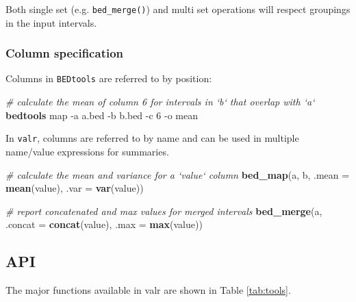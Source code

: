 \documentclass[9pt,a4paper]{extarticle}
\renewcommand{\KeywordTok}[1]{\textbf{{#1}}}
\renewcommand{\DataTypeTok}[1]{\textcolor[rgb]{0.50,0.00,0.00}{{#1}}}
\renewcommand{\CommentTok}[1]{\textcolor[rgb]{0.50,0.50,0.50}{\textit{{#1}}}}
\renewcommand{\NormalTok}[1]{{#1}}
\begin{document}
Both single set (e.g. \texttt{bed\_merge()}) and multi set operations
will respect groupings in the input intervals.

\subsubsection{Column specification}\label{column-specification}

Columns in \texttt{BEDtools} are referred to by position:

\begin{Shaded}
\begin{Highlighting}[]
\CommentTok{# calculate the mean of column 6 for intervals in `b` that overlap with `a`}
\KeywordTok{bedtools} \NormalTok{map -a a.bed -b b.bed -c 6 -o mean}
\end{Highlighting}
\end{Shaded}

In \texttt{valr}, columns are referred to by name and can be used in
multiple name/value expressions for summaries.

\begin{Shaded}
\begin{Highlighting}[]
\CommentTok{# calculate the mean and variance for a `value` column}
\KeywordTok{bed_map}\NormalTok{(a, b, }\DataTypeTok{.mean =} \KeywordTok{mean}\NormalTok{(value), }\DataTypeTok{.var =} \KeywordTok{var}\NormalTok{(value))}

\CommentTok{# report concatenated and max values for merged intervals}
\KeywordTok{bed_merge}\NormalTok{(a, }\DataTypeTok{.concat =} \KeywordTok{concat}\NormalTok{(value), }\DataTypeTok{.max =} \KeywordTok{max}\NormalTok{(value))}
\end{Highlighting}
\end{Shaded}


\subsection{API}\label{api}
The major functions available in valr are shown in Table \ref{tab:tools}. 
\end{document}
